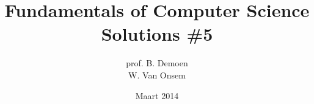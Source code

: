 \documentclass{article}
\title{Fundamentals of Computer Science\\Solutions \#5}
\author{prof. B. Demoen\\W. Van Onsem}
\date{Maart 2014}
\begin{document}
\maketitle
\begin{exercise}

\end{exercise}
\end{document}
